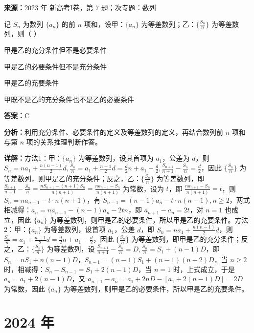 \begin{question}[points=5]
\textbf{来源：}2023 年 新高考I卷，第 7 题；次专题：数列\par
记 $S_n$ 为数列 $\{a_n\}$ 的前 $n$ 项和，设甲：$\{a_n\}$ 为等差数列；乙：$\{\frac{S_n}{n}\}$ 为等差数列，则（ ）
\begin{choices}
  \item 甲是乙的充分条件但不是必要条件
  \item 甲是乙的必要条件但不是充分条件
  \item 甲是乙的充要条件
  \item 甲既不是乙的充分条件也不是乙的必要条件
\end{choices}
\begin{solution}
\textbf{答案：}C

\textbf{分析：}利用充分条件、必要条件的定义及等差数列的定义，再结合数列前 $n$ 项和与第 $n$ 项的关系推理判断作答。

\textbf{详解：}方法1：甲：$\{a_n\}$ 为等差数列，设其首项为 $a_1$，公差为 $d$，则 $S_n=na_1+\frac{n(n-1)}{2}d, \frac{S_n}{n}=a_1+\frac{n-1}{2}d=\frac{d}{2}n+a_1-\frac{d}{2}, \frac{S_{n+1}}{n+1}-\frac{S_n}{n}=\frac{d}{2}$，因此 $\{\frac{S_n}{n}\}$ 为等差数列，则甲是乙的充分条件；反之，乙：$\{\frac{S_n}{n}\}$ 为等差数列，即 $\frac{S_{n+1}}{n+1}-\frac{S_n}{n}=\frac{nS_{n+1}-(n+1)S_n}{n(n+1)}=\frac{na_{n+1}-S_n}{n(n+1)}$ 为常数，设为 $t$，即 $\frac{na_{n+1}-S_n}{n(n+1)}=t$，则 $S_n=na_{n+1}-t\cdot n(n+1)$，有 $S_{n-1}=(n-1)a_n-t\cdot n(n-1), n\geq 2$，两式相减得：$a_n=na_{n+1}-(n-1)a_n-2tn$，即 $a_{n+1}-a_n=2t$，对 $n=1$ 也成立，因此 $\{a_n\}$ 为等差数列，则甲是乙的必要条件，所以甲是乙的充要条件。方法2：甲：$\{a_n\}$ 为等差数列，设首项 $a_1$，公差 $d$，即 $S_n=na_1+\frac{n(n-1)}{2}d$，则 $\frac{S_n}{n}=a_1+\frac{n-1}{2}d=\frac{d}{2}n+a_1-\frac{d}{2}$，因此 $\{\frac{S_n}{n}\}$ 为等差数列，即甲是乙的充分条件；反之，乙：$\{\frac{S_n}{n}\}$ 为等差数列，设 $\frac{S_{n+1}}{n+1}-\frac{S_n}{n}=D, \frac{S_n}{n}=S_1+(n-1)D$，即 $S_n=nS_1+n(n-1)D$，$S_{n-1}=(n-1)S_1+(n-1)(n-2)D$，当 $n\geq 2$ 时，相减得：$S_n-S_{n-1}=S_1+2(n-1)D$，当 $n=1$ 时，上式成立，于是 $a_n=a_1+2(n-1)D$，又 $a_{n+1}-a_n=a_1+2nD-[a_1+2(n-1)D]=2D$ 为常数，因此 $\{a_n\}$ 为等差数列，则甲是乙的必要条件，所以甲是乙的充要条件。
\end{solution}
\end{question}

\section*{2024 年}

